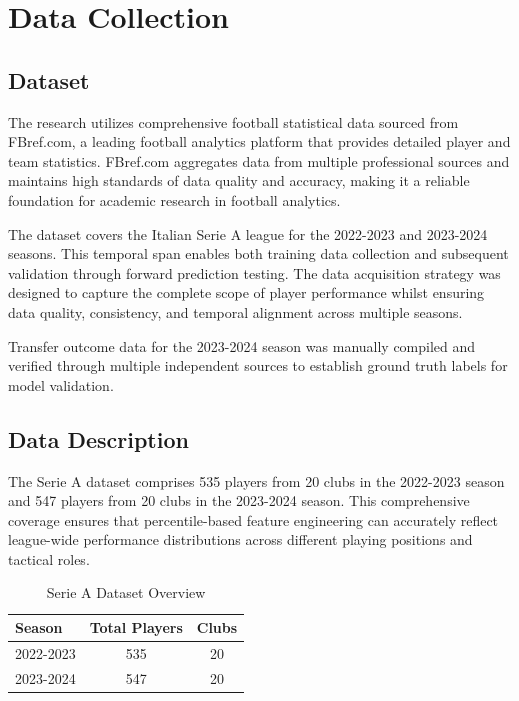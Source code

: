 \section{Data Collection}

\subsection{Dataset}

The research utilizes comprehensive football statistical data sourced from FBref.com, a leading football analytics platform that provides detailed player and team statistics. FBref.com aggregates data from multiple professional sources and maintains high standards of data quality and accuracy, making it a reliable foundation for academic research in football analytics.

The dataset covers the Italian Serie A league for the 2022-2023 and 2023-2024 seasons. This temporal span enables both training data collection and subsequent validation through forward prediction testing. The data acquisition strategy was designed to capture the complete scope of player performance whilst ensuring data quality, consistency, and temporal alignment across multiple seasons.

Transfer outcome data for the 2023-2024 season was manually compiled and verified through multiple independent sources to establish ground truth labels for model validation.

\subsection{Data Description}

The Serie A dataset comprises 535 players from 20 clubs in the 2022-2023 season and 547 players from 20 clubs in the 2023-2024 season. This comprehensive coverage ensures that percentile-based feature engineering can accurately reflect league-wide performance distributions across different playing positions and tactical roles.

\begin{table}[h]
\centering
\caption{Serie A Dataset Overview}
\label{tab:seria_dataset}
\begin{tabular}{lcc}
\toprule
\textbf{Season} & \textbf{Total Players} & \textbf{Clubs} \\
\midrule
2022-2023 & 535 & 20 \\
2023-2024 & 547 & 20 \\
\bottomrule
\end{tabular}
\end{table}

